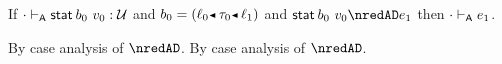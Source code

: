 \begin{lemma}\label{A-sta-type-preservation}
  If\/ $\snil \sWTA \estab{\sbnd_0}{\svalue_0} : \tdyn$
  and\/ $\sbnd_0 \eeq \obnd{\sowner_0}{\stype_0}{\sowner_1}$
  and\/ $\estab{\sbnd_0}{\svalue_0} \nredAD \sexpr_1$
  then\/ $\snil \sWTA \sexpr_1$.
\end{lemma}{
  \newcommand{\shortproof}{By case analysis of $\nredAD$.}
\begin{lamportproof*}
  \shortproof
\mainproof
  \shortproof

    \begin{pfproof}
      \qedstep
        \begin{pfproof}
          \begin{mathpar}
          \end{mathpar}
        \end{pfproof}
    \end{pfproof}

    \begin{pfproof}
      \qedstep
        \begin{pfproof}
          \begin{mathpar}
          \end{mathpar}
        \end{pfproof}
    \end{pfproof}


\end{lamportproof*}}
